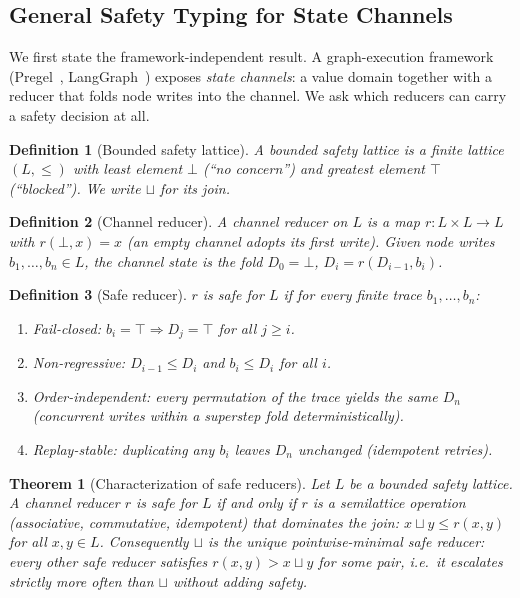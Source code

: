 \documentclass{article}
\newtheorem{definition}{Definition}
\newtheorem{theorem}{Theorem}
\begin{document}
\subsection{General Safety Typing for State Channels}
\label{sec:general_typing}

We first state the framework-independent result. A graph-execution framework
(Pregel~\cite{pregel}, LangGraph~\cite{langgraph}) exposes \emph{state channels}:
a value domain together with a reducer that folds node writes into the channel.
We ask which reducers can carry a safety decision at all.

\begin{definition}[Bounded safety lattice]
A \emph{bounded safety lattice} is a finite lattice $(L,\leq)$ with least element
$\bot$ (``no concern'') and greatest element $\top$ (``blocked''). We write
$\sqcup$ for its join.
\end{definition}

\begin{definition}[Channel reducer]
A \emph{channel reducer} on $L$ is a map $r: L\times L\to L$ with $r(\bot,x)=x$
(an empty channel adopts its first write). Given node writes $b_1,\dots,b_n\in L$,
the channel state is the fold $D_0=\bot$, $D_i=r(D_{i-1},b_i)$.
\end{definition}

\begin{definition}[Safe reducer]
\label{def:safe}
$r$ is \emph{safe} for $L$ if for every finite trace $b_1,\dots,b_n$:
\begin{enumerate}
\item[(S1)] \emph{Fail-closed}: $b_i=\top \Rightarrow D_j=\top$ for all $j\ge i$.
\item[(S2)] \emph{Non-regressive}: $D_{i-1}\le D_i$ and $b_i\le D_i$ for all $i$.
\item[(S3)] \emph{Order-independent}: every permutation of the trace yields the same $D_n$
  (concurrent writes within a superstep fold deterministically).
\item[(S4)] \emph{Replay-stable}: duplicating any $b_i$ leaves $D_n$ unchanged
  (idempotent retries).
\end{enumerate}
\end{definition}

\begin{theorem}[Characterization of safe reducers]
\label{thm:general_char}
Let $L$ be a bounded safety lattice. A channel reducer $r$ is safe for $L$ if and
only if $r$ is a semilattice operation (associative, commutative, idempotent)
that dominates the join: $x\sqcup y\le r(x,y)$ for all $x,y\in L$.
Consequently $\sqcup$ is the unique \emph{pointwise-minimal} safe reducer:
every other safe reducer satisfies $r(x,y)>x\sqcup y$ for some pair, i.e.\ it
escalates strictly more often than $\sqcup$ without adding safety.
\end{theorem}
\end{document}
